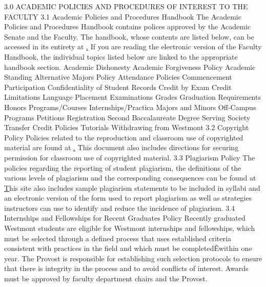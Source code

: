 \documentclass[letterpaper, 11pt]{article}
\begin{document}
3.0 ACADEMIC POLICIES AND PROCEDURES OF INTEREST TO THE FACULTY
3.1 Academic Policies and Procedures Handbook
   The Academic Policies and Procedures Handbook contains polices approved by
   the Academic Senate and the Faculty.  The handbook, whose contents are listed
   below, can be accessed in its entirety at
   \href{http://cgi2.westmont.edu/publications/academic_policies/} . 
   If you are reading the electronic version of the Faculty Handbook, the individual topics listed below are linked to the appropriate handbook section.
Academic Dishonesty
Academic Forgiveness Policy
Academic Standing 
Alternative Majors Policy 
Attendance Policies
Commencement Participation
Confidentiality of Student Records 
Credit by Exam 
Credit Limitations 
Language Placement 
Examinations 
Grades 
Graduation Requirements 
Honors Programs/Courses 
Internships/Practica 
Majors and Minors 
Off-Campus Programs 
Petitions 
Registration 
Second Baccalaureate Degree 
Serving Society 
Transfer Credit Policies 
Tutorials 
Withdrawing from Westmont
3.2 Copyright Policy
   Policies related to the reproduction and classroom use of copyrighted
   material are found at
   \href{http://www.westmont.edu/_faculty_staff/pages/policies/copyright_policy/index.html}.
   This document also includes directions for securing permission for classroom use of copyrighted material.
3.3 Plagiarism Policy
   The policies regarding the reporting of student plagiarism, the definitions
   of the various levels of plagiarism and the corresponding consequences can be
   found at
   \href{http://www.westmont.edu/_academics/pages/provost/curriculum/plagiarism/} 
   This site also includes sample plagiarism statements to be included in syllabi and an electronic version of the form used to report plagiarism as well as strategies instructors can use to identify and reduce the incidence of plagiarism.
3.4 Internships and Fellowships for Recent Graduates Policy
   Recently graduated Westmont students are eligible for Westmont internships and fellowships, which must be selected through a defined process that uses established criteria consistent with practices in the field and which must be completedÊwithin one year. The Provost is responsible for establishing such selection protocols to ensure that there is integrity in the process and to avoid conflicts of interest. Awards must be approved by faculty department chairs and the Provost.
   
\end{document}
